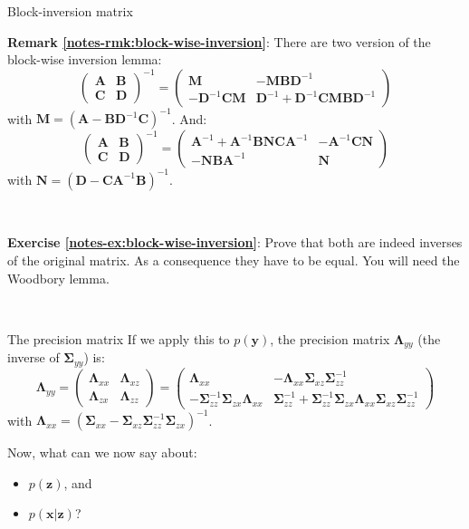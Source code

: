 \documentclass{beamer}
\newcommand{\myarray}[2]{\left(\begin{array}{#1}#2\end{array}\right)}
\newcommand{\bs}[1]{\boldsymbol{#1}}
\newcommand{\exercise}[2]{\noindent\colorbox{blue!10}{\parbox{0.995\textwidth}{\textbf{Exercise \ref{notes-ex:#1}}: #2}}\\}
\newcommand{\remark}[2]{\noindent\colorbox{red!10}{\parbox{0.995\textwidth}{\textbf{Remark \ref{notes-rmk:#1}}: #2}}\\}
\begin{document}
\begin{frame}{Block-inversion matrix}
\remark{block-wise-inversion}{There are two version of the block-wise inversion lemma:
\begin{equation*}
 \myarray{cc}{\bs{A} & \bs{B} \\ \bs{C} & \bs{D}}^{-1} = \myarray{cc}{\bs{M} & - \bs{M}\bs{B}\bs{D}^{-1} \\ -\bs{D}^{-1}\bs{C}\bs{M} & 
\bs{D}^{-1} + \bs{D}^{-1}\bs{C}\bs{M}\bs{B}\bs{D}^{-1}} \label{eq:block-inversion}
\end{equation*}
with $\bs{M} = (\bs{A}-\bs{B}\bs{D}^{-1}\bs{C})^{-1}$. And:
\begin{equation*}
 \myarray{cc}{\bs{A} & \bs{B} \\ \bs{C} & \bs{D}}^{-1} = \myarray{cc}{ \bs{A}^{-1} + \bs{A}^{-1}\bs{B}\bs{N}\bs{C}\bs{A}^{-1} & - \bs{A}^{-1}\bs{C}\bs{N} \\ -\bs{N}\bs{B}\bs{A}^{-1} & 
\bs{N}} \label{eq:block-inversion-v2}
\end{equation*}
with $\bs{N} = (\bs{D}-\bs{C}\bs{A}^{-1}\bs{B})^{-1}$.
}\vspace{3mm}

\exercise{block-wise-inversion}{Prove that both are indeed inverses of the original matrix. As a consequence they have to be equal. You will need the Woodbory lemma.}


\end{frame}


\begin{frame}{The precision matrix}
 If we apply this to $p(\bs{y})$, the precision matrix $\bs{\Lambda}_{yy}$ (the inverse of $\bs{\Sigma}_{yy}$) is:
\begin{equation*}
 \bs{\Lambda}_{yy} =  \myarray{cc}{\bs{\Lambda}_{xx} & \bs{\Lambda}_{xz} \\ \bs{\Lambda}_{zx} & \bs{\Lambda}_{zz}} = \myarray{cc}{\bs{\Lambda}_{xx} & 
-\bs{\Lambda}_{xx}\bs{\Sigma}_{xz}\bs{\Sigma}_{zz}^{-1} \\ -\bs{\Sigma}_{zz}^{-1}\bs{\Sigma}_{zx}\bs{\Lambda}_{xx} & \bs{\Sigma}_{zz}^{-1} + 
\bs{\Sigma}_{zz}^{-1}\bs{\Sigma}_{zx}\bs{\Lambda}_{xx}\bs{\Sigma}_{xz}\bs{\Sigma}_{zz}^{-1}}\label{eq:block-inversion-covariance}
\end{equation*}
with $\bs{\Lambda}_{xx} = (\bs{\Sigma}_{xx} - \bs{\Sigma}_{xz}\bs{\Sigma}_{zz}^{-1}\bs{\Sigma}_{zx})^{-1}$.\vspace{5mm}

Now, what can we now say about:
\begin{itemize}
 \item $p(\bs{z})$, and
 \item $p(\bs{x}|\bs{z})$?
\end{itemize}

\end{frame}
\end{document}
